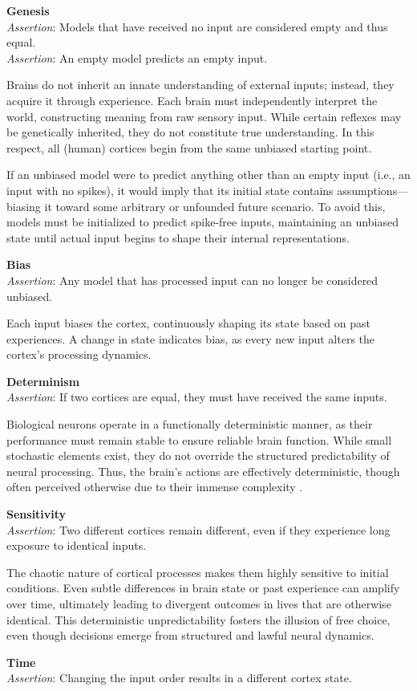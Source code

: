 \documentclass{article}
\newcommand{\agitbtest}[2]{
 \item \textbf{#1} \\
 #2
}
\begin{document}
\begin{agitblist}
\agitbtest{Genesis}{
\emph{Assertion}: Models that have received no input are considered empty and thus equal.\\
\emph{Assertion}: An empty model predicts an empty input.

Brains do not inherit an innate understanding of external inputs; instead, they acquire it through experience. Each brain must independently interpret the world, constructing meaning from raw sensory input. While certain reflexes may be genetically inherited, they do not constitute true understanding. In this respect, all (human) cortices begin from the same unbiased starting point.

If an unbiased model were to predict anything other than an empty input (i.e., an input with no spikes), it would imply that its initial state contains assumptions—biasing it toward some arbitrary or unfounded future scenario. To avoid this, models must be initialized to predict spike-free inputs, maintaining an unbiased state until actual input begins to shape their internal representations.

}
\agitbtest{Bias}{
\emph{Assertion}: Any model that has processed input can no longer be considered unbiased.

Each input biases the cortex, continuously shaping its state based on past experiences. A change in state indicates bias, as every new input alters the cortex's processing dynamics.
}
\agitbtest{Determinism}{
\emph{Assertion}: If two cortices are equal, they must have received the same inputs.

Biological neurons operate in a functionally deterministic manner, as their performance must remain stable to ensure reliable brain function. While small stochastic elements exist, they do not override the structured predictability of neural processing. Thus, the brain's actions are effectively deterministic, though often perceived otherwise due to their immense complexity \cite{AtlanticFreeWill}.
}
\agitbtest{Sensitivity}{
\emph{Assertion}: Two different cortices remain different, even if they experience long exposure to identical inputs.

The chaotic nature of cortical processes makes them highly sensitive to initial conditions. Even subtle differences in brain state or past experience can amplify over time, ultimately leading to divergent outcomes in lives that are otherwise identical. This deterministic unpredictability fosters the illusion of free choice, even though decisions emerge from structured and lawful neural dynamics.
}
\agitbtest{Time}{
\emph{Assertion}: Changing the input order results in a different cortex state.

}
\end{agitblist}
\end{document}
